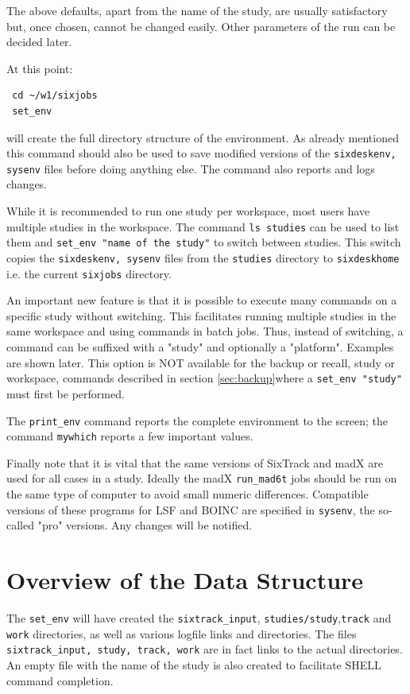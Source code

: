 \documentclass{article}    %
\begin{document}
The above defaults, apart from the name of the study, are usually satisfactory
but, once chosen, cannot be changed easily. Other parameters of the run can be
decided later.

At this point:
\begin{verbatim}
 cd ~/w1/sixjobs
 set_env
\end{verbatim}
will create the full directory structure of the environment.  As already
mentioned this command should also be used to save modified versions of the
{\tt sixdeskenv, sysenv} files before doing anything else. The command also
reports and logs changes.

While it is recommended to run one study per workspace, most users have
multiple studies in the workspace. The command {\tt ls studies} can be used
to list them and {\tt set\_env "name of the study"} to switch between studies.
This switch copies the {\tt sixdeskenv, sysenv} files from the {\tt studies}
directory to {\tt sixdeskhome} i.e. the current {\tt sixjobs} directory. 

An important new feature is that it is possible to execute many commands
on a specific study without switching. This facilitates running multiple
studies in the same workspace and using commands in batch jobs.  Thus, instead
of switching, a command can be suffixed with a "study" and optionally a
"platform". Examples are shown later.  This option is NOT available for the
backup or recall, study or workspace, commands described in section
\ref{sec:backup}where a {\tt set\_env "study"} must first be performed.

The {\tt print\_env} command reports the complete environment to the screen;
the command {\tt mywhich} reports a few important values.

Finally note that it is vital that the same versions of SixTrack and madX are
used for all cases in a study. Ideally the madX {\tt run\_mad6t} jobs should
be run on the same type of computer to avoid small numeric differences.
Compatible versions of these programs for LSF and BOINC are specified
in {\tt sysenv}, the so-called "pro" versions. Any changes will be notified.

\section{Overview of the Data Structure}
The {\tt set\_env} will have created the {\tt sixtrack\_input},
{\tt studies/study},{\tt track} and {\tt work} directories, as well
as various logfile links and directories. 
The files {\tt sixtrack\_input, study, track, work} are in fact
links to the actual directories. An empty file with the name of the study
is also created to facilitate SHELL command completion.     
\end{document}
